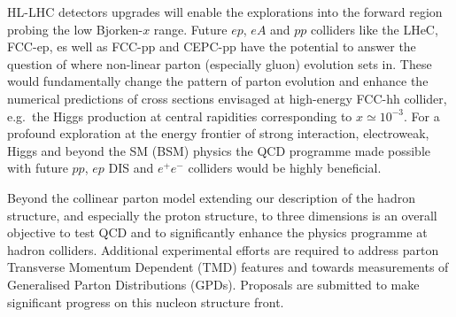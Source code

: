 HL-LHC detectors upgrades will enable the explorations into the forward region probing the low Bjorken-$x$ range. Future $ep$,  $eA$  and $pp$ colliders like the LHeC,  FCC-ep, es well as  FCC-pp and  CEPC-pp  have the potential to %
answer the question of where 
non-linear parton (especially gluon) evolution sets in. These would fundamentally change the pattern of parton evolution and enhance the numerical predictions of cross sections envisaged at high-energy FCC-hh 
collider, e.g.\ the Higgs production at %
central rapidities corresponding to $x \simeq 10^{-3}$. For a profound exploration at the energy frontier of strong interaction, electroweak, Higgs and beyond the SM (BSM) physics the QCD programme made possible with future  $pp$, $ep$ DIS and $e^+e^-$ colliders would be highly beneficial.

Beyond the collinear parton model extending our description of the hadron structure, and especially the proton structure, to three dimensions is an overall objective to test QCD and to significantly enhance the physics programme at hadron colliders. Additional experimental efforts are required to address parton Transverse Momentum Dependent (TMD) features and towards measurements of Generalised Parton Distributions (GPDs). Proposals are submitted to make significant progress on this nucleon structure front.
\vfill




